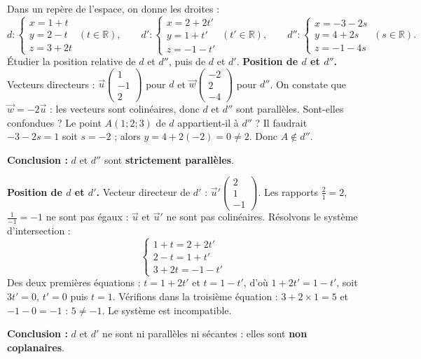\documentclass[11pt]{article}
\begin{document}
\begin{exoresolu}
Dans un repère de l'espace, on donne les droites :
\[ d:\begin{cases} x = 1 + t \\ y = 2 - t \\ z = 3 + 2t \end{cases}\ (t\in\mathbb{R}), \qquad d':\begin{cases} x = 2 + 2t' \\ y = 1 + t' \\ z = -1 - t' \end{cases}\ (t'\in\mathbb{R}), \qquad d'':\begin{cases} x = -3 - 2s \\ y = 4 + 2s \\ z = -1 - 4s \end{cases}\ (s\in\mathbb{R}). \]
Étudier la position relative de $d$ et $d''$, puis de $d$ et $d'$.
\tcblower
\textbf{Position de $d$ et $d''$.} Vecteurs directeurs : $\vec{u}\begin{pmatrix} 1 \\ -1 \\ 2 \end{pmatrix}$ pour $d$ et $\vec{w}\begin{pmatrix} -2 \\ 2 \\ -4 \end{pmatrix}$ pour $d''$. On constate que $\vec{w}=-2\vec{u}$ : les vecteurs sont colinéaires, donc $d$ et $d''$ sont parallèles. Sont-elles confondues ? Le point $A(1;2;3)$ de $d$ appartient-il à $d''$ ? Il faudrait $-3-2s=1$ soit $s=-2$ ; alors $y=4+2(-2)=0\neq 2$. Donc $A\notin d''$.

\textbf{Conclusion :} $d$ et $d''$ sont \textbf{strictement parallèles}.

\textbf{Position de $d$ et $d'$.} Vecteur directeur de $d'$ : $\vec{u}'\begin{pmatrix} 2 \\ 1 \\ -1 \end{pmatrix}$. Les rapports $\frac{2}{1}=2$, $\frac{1}{-1}=-1$ ne sont pas égaux : $\vec{u}$ et $\vec{u}'$ ne sont pas colinéaires. Résolvons le système d'intersection :
\[ \begin{cases} 1+t = 2+2t' \\ 2-t = 1+t' \\ 3+2t = -1-t' \end{cases} \]
Des deux premières équations : $t=1+2t'$ et $t=1-t'$, d'où $1+2t'=1-t'$, soit $3t'=0$, $t'=0$ puis $t=1$. Vérifions dans la troisième équation : $3+2\times 1=5$ et $-1-0=-1$ : $5\neq -1$. Le système est incompatible.

\textbf{Conclusion :} $d$ et $d'$ ne sont ni parallèles ni sécantes : elles sont \textbf{non coplanaires}.
\end{exoresolu}
\end{document}
